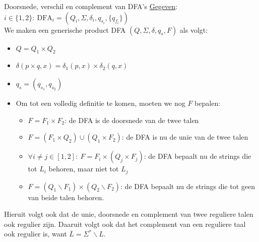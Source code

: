 \begin{pro}{Doorsnede, verschil en complement van DFA's}
    \underline{Gegeven}: $i \in \{1,2\}: \ {\text{DFA}}_i = (Q_i,\Sigma, \delta_i, q_{s_i}, \{q_{f_i}\})$ \\

    We maken een generische product DFA $(Q,\Sigma, \delta, q_s, F)$ als volgt:
    \begin{itemize}
        \item $Q = Q_1 \times Q_2$
        \item $\delta(p \times q, x) = \delta_1(p,x) \times \delta_2(q,x)$
        \item $q_s = (q_{s_1},q_{s_2})$
        \item 
            Om tot een volledig definitie te komen, moeten we nog $F$ bepalen:
            \begin{itemize}
                \item $F = F_1 \times F_2$: de DFA is de doorsnede van de twee talen
                \item $F = (F_1 \times Q_2) \cup (Q_1 \times F_2)$: de DFA is nu de unie van de twee talen
                \item $\forall i \neq j \in [1,2]: \ F =  F_i \times (Q_j \times F_j)$: de DFA bepaalt nu de strings die tot $L_i$ behoren, maar niet tot $L_j$
                \item $F = (Q_1 \backslash F_1) \times (Q_2 \backslash F_2)$: de DFA bepaalt nu de strings die tot geen van beide talen behoren.
            \end{itemize}
    \end{itemize}
    Hieruit volgt ook dat de unie, doorsnede en complement van twee reguliere talen ook regulier zijn. Daaruit volgt ook dat het
    complement van een reguliere taal ook regulier is, want $\overline{L} = \Sigma^* \backslash L$.
\end{pro}


